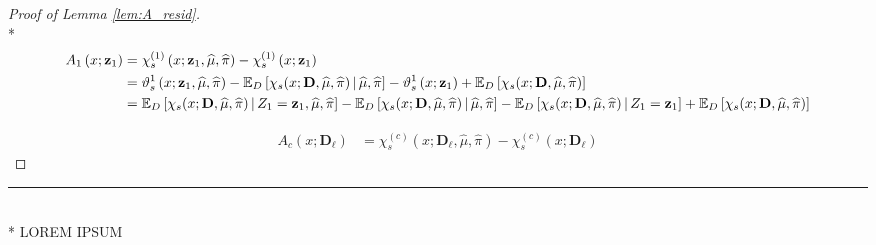 \begin{proof}[Proof of Lemma \ref{lem:A_resid}]\mbox{}\\*
    \begin{equation}
        \begin{aligned}
            A_{1}\left(x; \mathbf{z}_{1}\right)
            & = \chi_{s}^{(1)}\left(x; \mathbf{z}_{1}, \widehat{\mu}, \widehat{\pi}\right) - \chi_{s}^{(1)}\left(x; \mathbf{z}_{1}\right) \\
            & = \vartheta_{s}^{1}\left(x; \mathbf{z}_{1}, \widehat{\mu}, \widehat{\pi}\right)
            - \mathbb{E}_{D}\left[\chi_{s}(x; \mathbf{D}, \widehat{\mu}, \widehat{\pi}) \, \middle| \, \widehat{\mu}, \widehat{\pi}\right]
            - \vartheta_{s}^{1}\left(x; \mathbf{z}_{1}\right)
            + \mathbb{E}_{D}\left[\chi_{s}(x; \mathbf{D}, \widehat{\mu}, \widehat{\pi})\right]\\
            & = \mathbb{E}_{D}\left[\chi_{s}(x; \mathbf{D}, \widehat{\mu}, \widehat{\pi}) \, \middle| \, Z_1 = \mathbf{z}_1, \widehat{\mu}, \widehat{\pi}\right]
            - \mathbb{E}_{D}\left[\chi_{s}(x; \mathbf{D}, \widehat{\mu}, \widehat{\pi}) \, \middle| \, \widehat{\mu}, \widehat{\pi}\right]
            - \mathbb{E}_{D}\left[\chi_{s}(x; \mathbf{D}, \widehat{\mu}, \widehat{\pi}) \, \middle| \, Z_1 = \mathbf{z}_1\right]
            + \mathbb{E}_{D}\left[\chi_{s}(x; \mathbf{D}, \widehat{\mu}, \widehat{\pi})\right]
        \end{aligned}
    \end{equation}
    
    \begin{equation}
        \begin{aligned}
            A_{c}\left(x; \mathbf{D}_{\ell}\right)
            & = \chi_{s}^{(c)}\left(x; \mathbf{D}_{\ell}, \hat{\mu}, \hat{\pi}\right) - \chi_{s}^{(c)}\left(x; \mathbf{D}_{\ell}\right)
        \end{aligned}
    \end{equation}
\end{proof}

\hrule

\begin{lem}\label{lem:B_resid}\mbox{}\\*
    {\color{red} LOREM IPSUM}
\end{lem}

